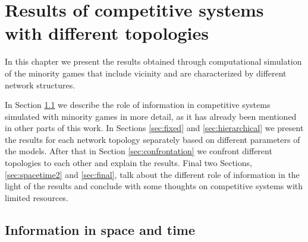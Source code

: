 \chapter{Results of competitive systems with different topologies}
\label{chapter:results}

In this chapter we present the results obtained through computational simulation of the minority games that include vicinity and are characterized by different network structures.

In Section \ref{sec:spacetime} we describe the role of information in competitive systems simulated with minority games in more detail, as it has already been mentioned in other parts of this work.
In Sections \ref{sec:fixed} and \ref{sec:hierarchical} we present the results for each network topology separately based on different parameters of the models.
After that in Section \ref{sec:confrontation} we confront different topologies to each other and explain the results.
Final two Sections, \ref{sec:spacetime2} and \ref{sec:final}, talk about the different role of information in the light of the results and conclude with some thoughts on competitive systems with limited resources. 

\section{Information in space and time}
\label{sec:spacetime}

